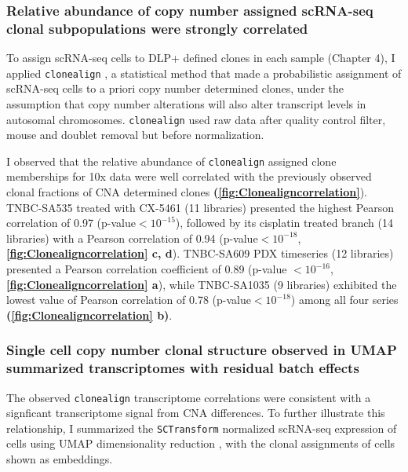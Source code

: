 

\subsubsection{Relative abundance of copy number assigned scRNA-seq clonal subpopulations were strongly correlated}
 
To assign scRNA-seq cells to DLP+ defined clones in each sample (Chapter 4), I applied \texttt{clonealign} \cite{campbell2019clonealign}, a statistical method that made a probabilistic assignment of scRNA-seq cells to a priori copy number determined clones, under the assumption that copy number alterations will also alter transcript levels in autosomal chromosomes. \texttt{clonealign} used raw data after quality control filter, mouse and doublet removal but before normalization.
 
I observed that the relative abundance of \texttt{clonealign} assigned clone memberships for 10x data were well correlated with the previously observed clonal fractions of CNA determined clones \textbf{(\autoref{fig:Clonealigncorrelation}}). TNBC-SA535 treated with CX-5461 (11 libraries) presented the highest Pearson correlation of 0.97 (p-value$< 10^{-15}$), followed by its cisplatin treated branch (14 libraries) with a Pearson correlation of 0.94 (p-value$< 10^{-18}$,  \textbf{\autoref{fig:Clonealigncorrelation} c, d}). TNBC-SA609 PDX timeseries (12 libraries) presented a Pearson correlation coefficient of 0.89 (p-value $< 10^{-16}$, \textbf{\autoref{fig:Clonealigncorrelation} a}), while TNBC-SA1035 (9 libraries) exhibited the lowest value of Pearson correlation of 0.78 (p-value$< 10^{-18}$) among all four series \textbf{(\autoref{fig:Clonealigncorrelation} b)}.
  

 
  
\subsubsection{Single cell copy number clonal structure observed in UMAP summarized transcriptomes with residual batch effects}

The observed \texttt{clonealign} transcriptome correlations were consistent with a signficant transcriptome signal from CNA differences.  To further illustrate this relationship, I summarized the \texttt{SCTransform} normalized scRNA-seq expression of cells using UMAP dimensionality reduction \cite{becht2019dimensionality}, with the clonal assignments of cells shown as embeddings. 

